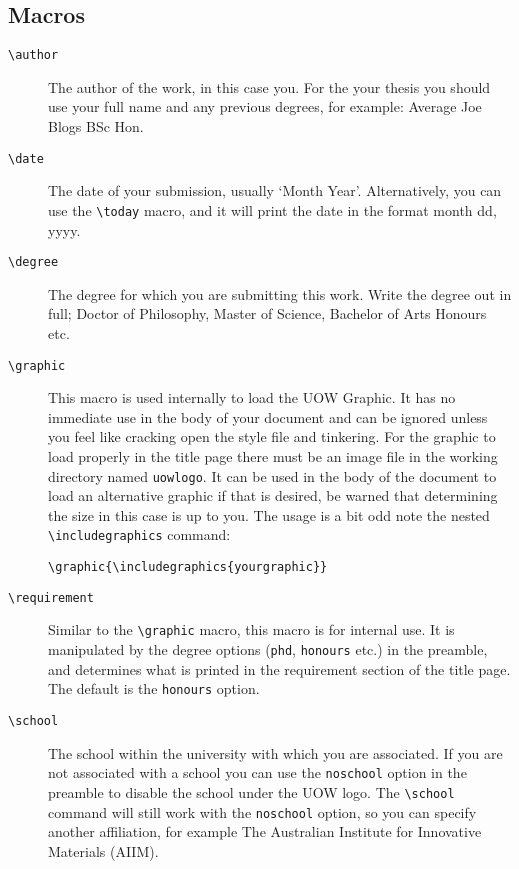 \documentclass[12pt,oneside]{article}
\newcommand{\oporcom}[1]{\texttt{\color{RoyalBlue}#1}} %
\begin{document}
\subsection*{Macros}
\begin{description}
    \item[\oporcom{\textbackslash{}author}]
    The author of the work, in this case you. For the your thesis you should use your full name and any previous degrees, for example: Average Joe Blogs BSc Hon.
    
    \item[\oporcom{\textbackslash{}date}]
    The date of your submission, usually `Month Year'. Alternatively, you can use the \oporcom{\textbackslash{}today} macro, and it will print the date in the format month dd, yyyy.
    
    \item[\oporcom{\textbackslash{}degree}]
    The degree for which you are submitting this work. Write the degree out in full; Doctor of Philosophy, Master of Science, Bachelor of Arts Honours etc.
    
    \item[\oporcom{\textbackslash{}graphic}]
    This macro is used internally to load the UOW Graphic. It has no immediate use in the body of your document and can be ignored unless you feel like cracking open the style file and tinkering. For the graphic to load properly in the title page there must be an image file in the working directory named \texttt{uow\textunderscore{}logo}. It can be used in the body of the document to load an alternative graphic if that is desired, be warned that determining the size in this case is up to you.
    The usage is a bit odd note the nested \verb+\includegraphics+ command:
    
    \oporcom{\textbackslash{}graphic}\texttt{\{\textbackslash{}includegraphics\{yourgraphic\}\}} 
    
    \item[\oporcom{\textbackslash{}requirement}]
    Similar to the \oporcom{\textbackslash{}graphic} macro, this macro is for internal use. It is manipulated by the degree options (\oporcom{phd}, \oporcom{honours} etc.) in the preamble, and determines what is printed in the requirement section of the title page. The default is the \oporcom{honours} option.
    
    \item[\oporcom{\textbackslash{}school}]
    The school within the university with which you are associated. If you are not associated with a school you can use the \oporcom{noschool} option in the preamble to disable the school under the UOW logo. The \oporcom{\textbackslash{}school} command will still work with the \oporcom{noschool} option, so you can specify another affiliation, for example The Australian Institute for Innovative Materials (AIIM).
    

\end{description}
\end{document}
